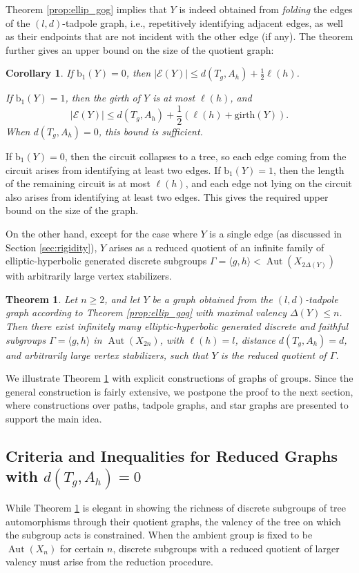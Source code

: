 \documentclass[12pt,leqno]{amsart}
\makeatletter
\renewenvironment{proof}[1][\proofname]{%
	\par
	\pushQED{\qed}%
	\normalfont
	\topsep6\p@\@plus6\p@\relax
	\trivlist
	\item[\hskip\labelsep\itshape #1\@addpunct{.}]%
	\ignorespaces
}{%
	\par\nobreak\vspace{2pt}%
	\popQED%
	\medskip%
	\endtrivlist
	\@endpefalse
}
\newcommand{\2}{L^2_{\rm per}(0, T)}
\newtheorem{thm}{Theorem}[section]
\newtheorem{cor}{Corollary}[section]
\newcommand{\aut}{{\operatorname{Aut}}}
\numberwithin{equation}{section}
\numberwithin{figure}{section}
\makeatother
\begin{document}
Theorem \ref{prop:ellip_gog} implies that $Y$ is indeed obtained from \emph{folding} the edges of the $(l,d)$-tadpole graph, i.e., repetitively identifying adjacent edges, as well as their endpoints that are not incident with the other edge (if any). The theorem further gives an upper bound on the size of the quotient graph:
\begin{cor}\label{cor:ellip_gog}
    If $\mathrm{b}_1(Y) = 0$, then $\lvert\mathcal{E}(Y)\rvert\leq d(T_g,A_h) + \frac{1}{2}\ell(h)$.
    
    If $\mathrm{b}_1(Y) = 1$, then the girth of $Y$ is at most $\ell(h)$, and
    \[
    \lvert\mathcal{E}(Y)\rvert\leq d(T_g,A_h) +\frac{1}{2}(\ell(h)+\mathrm{girth}(Y)).
    \]
    When $d(T_g,A_h) = 0$, this bound is sufficient.
\end{cor}
\begin{proof}
    If $\mathrm{b}_1(Y) = 0$, then the circuit collapses to a tree, so each edge coming from the circuit arises from identifying at least two edges. If $\mathrm{b}_1(Y) = 1$, then the length of the remaining circuit is at most $\ell(h)$, and each edge not lying on the circuit also arises from identifying at least two edges. This gives the required upper bound on the size of the graph.
\end{proof}
On the other hand, except for the case where $Y$ is a single edge (as discussed in Section \ref{sec:rigidity}), $Y$ arises as a reduced quotient of an infinite family of elliptic-hyperbolic generated discrete subgroups $\Gamma = \langle g,h\rangle <\aut(X_{2\Delta(Y)})$ with arbitrarily large vertex stabilizers.
\begin{thm}\label{thm:ellip_gog}
    Let $n\geq 2$, and let $Y$ be a graph obtained from the $(l,d)$-tadpole graph according to Theorem \ref{prop:ellip_gog} with maximal valency $\Delta(Y)\leq n$. Then there exist infinitely many elliptic-hyperbolic generated discrete and faithful subgroups $\Gamma = \langle g,h\rangle$ in $\aut(X_{2n})$, with $\ell(h) = l$, distance $d(T_g,A_h) = d$, and arbitrarily large vertex stabilizers, such that $Y$ is the reduced quotient of $\Gamma$.
\end{thm}
We illustrate Theorem \ref{thm:ellip_gog} with explicit constructions of graphs of groups. Since the general construction is fairly extensive, we postpone the proof to the next section, where constructions over paths, tadpole graphs, and star graphs are presented to support the main idea.
\subsection{Criteria and Inequalities for Reduced Graphs with \texorpdfstring{$d(T_g,A_h) = 0$}{d(Tg,Ah)=0}}
While Theorem \ref{thm:ellip_gog} is elegant in showing the richness of discrete subgroups of tree automorphisms through their quotient graphs, the valency of the tree on which the subgroup acts is constrained. When the ambient group is fixed to be $\aut(X_n)$ for certain $n$, discrete subgroups with a reduced quotient of larger valency must arise from the reduction procedure.
\end{document}
